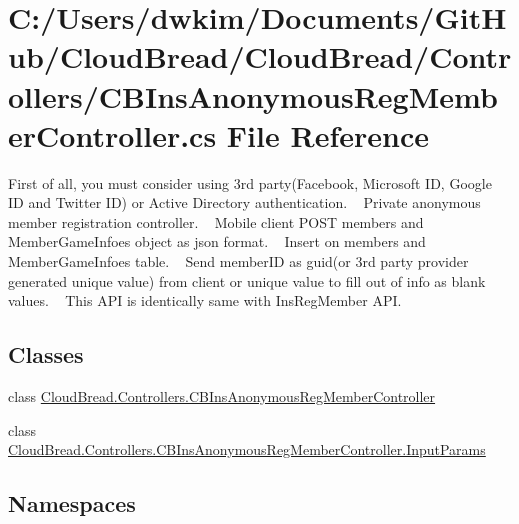 \hypertarget{a00214}{}\section{C\+:/\+Users/dwkim/\+Documents/\+Git\+Hub/\+Cloud\+Bread/\+Cloud\+Bread/\+Controllers/\+C\+B\+Ins\+Anonymous\+Reg\+Member\+Controller.cs File Reference}
\label{a00214}


First of all, you must consider using 3rd party(\+Facebook, Microsoft I\+D, Google I\+D and Twitter I\+D) or Active Directory authentication. ~\newline
Private anonymous member registration controller. ~\newline
Mobile client P\+O\+ST members and Member\+Game\+Infoes object as json format. ~\newline
Insert on members and Member\+Game\+Infoes table. ~\newline
Send member\+ID as guid(or 3rd party provider generated unique value) from client or unique value to fill out of info as blank values. ~\newline
This A\+PI is identically same with Ins\+Reg\+Member A\+PI.  


\subsection*{Classes}
\begin{DoxyCompactItemize}
\item 
class \hyperlink{a00041}{Cloud\+Bread.\+Controllers.\+C\+B\+Ins\+Anonymous\+Reg\+Member\+Controller}
\item 
class \hyperlink{a00115}{Cloud\+Bread.\+Controllers.\+C\+B\+Ins\+Anonymous\+Reg\+Member\+Controller.\+Input\+Params}
\end{DoxyCompactItemize}
\subsection*{Namespaces}
\begin{DoxyCompactItemize}
\end{DoxyCompactItemize}


